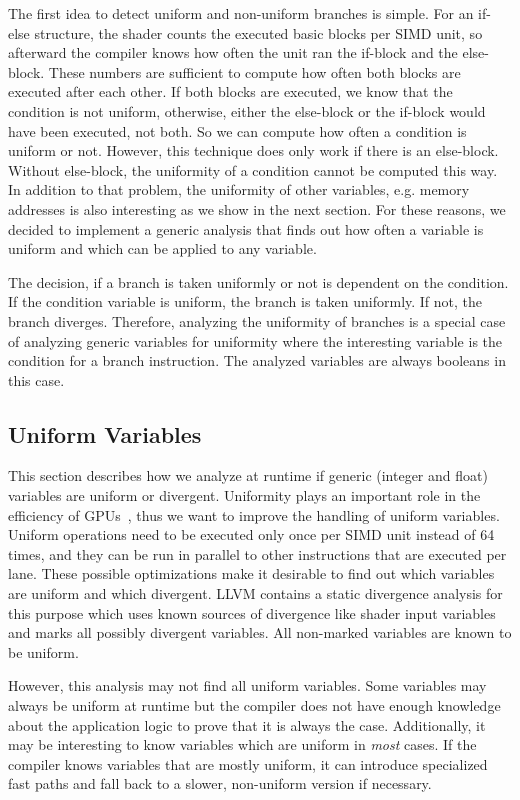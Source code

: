 The first idea to detect uniform and non-uniform branches is simple.
For an if-else structure, the shader counts the executed basic blocks per SIMD unit, so afterward the compiler knows how often the unit ran the if-block and the else-block. These numbers are sufficient to compute how often both blocks are executed after each other.
If both blocks are executed, we know that the condition is not uniform, otherwise, either the else-block or the if-block would have been executed, not both. So we can compute how often a condition is uniform or not.
However, this technique does only work if there is an else-block. Without else-block, the uniformity of a condition cannot be computed this way.
In addition to that problem, the uniformity of other variables, e.g. memory addresses is also interesting as we show in the next section.
For these reasons, we decided to implement a generic analysis that finds out how often a variable is uniform and which can be applied to any variable.

The decision, if a branch is taken uniformly or not is dependent on the condition.
If the condition variable is uniform, the branch is taken uniformly. If not, the branch diverges.
Therefore, analyzing the uniformity of branches is a special case of analyzing generic variables for uniformity where the interesting variable is the condition for a branch instruction.
The analyzed variables are always booleans in this case.

\subsection{Uniform Variables}
\label{sub:uniformity}
This section describes how we analyze at runtime if generic (integer and float) variables are uniform or divergent.
Uniformity plays an important role in the efficiency of GPUs~\cite{Chen2016}, thus we want to improve the handling of uniform variables.
Uniform operations need to be executed only once per SIMD unit instead of 64 times, and they can be run in parallel to other instructions that are executed per lane.
These possible optimizations make it desirable to find out which variables are uniform and which divergent.
LLVM contains a static divergence analysis for this purpose which uses known sources of divergence like shader input variables and marks all possibly divergent variables.
All non-marked variables are known to be uniform.

However, this analysis may not find all uniform variables.
Some variables may always be uniform at runtime but the compiler does not have enough knowledge about the application logic to prove that it is always the case.
Additionally, it may be interesting to know variables which are uniform in \emph{most} cases.
If the compiler knows variables that are mostly uniform, it can introduce specialized fast paths and fall back to a slower, non-uniform version if necessary.

